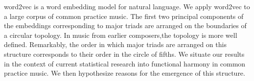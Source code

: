 word2vec is a word embedding model for natural language. We apply word2vec to a large corpus of common practice music. The first two principal components of the embeddings corresponding to major triads are arranged on the boundaries of a circular topology. In music from earlier composers,the topology is more well defined. Remarkably, the order in which major triads are arranged on this structure corresponds to their order in the circle of fifths. We situate our results in the context of current statistical research into functional harmony in common practice music. We then hypothesize reasons for the emergence of this structure.
